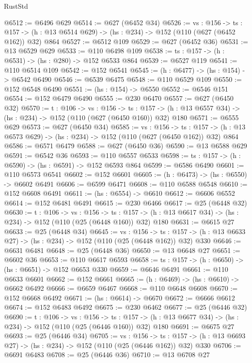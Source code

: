 \begin{lexlean}{RustStd}
\begin{coremodule}
@6512 := @6496 @629
@6514 := @627 (@6452 @34)
@6526 := {vs : @156} ->
  {ts : @157} -> (h : @13 @6514 @629) -> (hs : @234) -> @152 (@110 (@627 (@6452 @162)) @32) @864
@6527 := @6512 @109
@6529 := @627 (@6452 @36)
@6531 := @13 @6529 @629
@6533 := @110 @6498 @109
@6538 := {ts : @157} -> (h : @6531) -> (hs : @280) -> @152 @6533 @864
@6539 := @6527 @119
@6541 := @110 @6514 @109
@6542 := @152 @6541
@6545 := (h : @6477) -> (hs : @154) -> @6542 @6490
@6546 := @6539 @6475
@6548 := @110 @6529 @109
@6550 := @152 @6548 @6490
@6551 := (hs : @154) -> @6550
@6552 := @6546 @151
@6554 := @152 @6479 @6490
@6555 := @230 @6470
@6557 := @627 (@6450 @32)
@6570 := {t : @106} ->
  {vs : @156} ->
  {ts : @157} -> (h : @13 @6557 @34) -> (hs : @234) -> @152 (@110 (@627 (@6450 @160)) @32) @180
@6571 := @6555 @629
@6573 := @627 (@6450 @34)
@6585 := {vs : @156} ->
  {ts : @157} -> (h : @13 @6573 @629) -> (hs : @234) -> @152 (@110 (@627 (@6450 @162)) @32) @864
@6586 := @6571 @6479
@6588 := @627 (@6450 @36)
@6590 := @13 @6588 @629
@6591 := @6542 @36
@6593 := @110 @6557 @6533
@6598 := {ts : @157} -> (h : @6590) -> (hs : @6591) -> @152 @6593 @864
@6599 := @6586 @6490
@6601 := @110 @6573 @6541
@6602 := @152 @6601
@6605 := (h : @6473) -> (hs : @6550) -> @6602 @6491
@6606 := @6599 @6471
@6608 := @110 @6588 @6548
@6610 := @152 @6608 @6491
@6611 := (hs : @6554) -> @6610
@6612 := @6606 @6552
@6614 := @152 @6481 @6491
@6615 := @230 @6466
@6617 := @25 (@6448 @32)
@6630 := {t : @106} ->
  {vs : @156} ->
  {ts : @157} -> (h : @13 @6617 @34) -> (hs : @234) -> @152 (@110 (@25 (@6448 @160)) @32) @180
@6631 := @6615 @27
@6633 := @25 (@6448 @34)
@6645 := {vs : @156} ->
  {ts : @157} -> (h : @13 @6633 @27) -> (hs : @234) -> @152 (@110 (@25 (@6448 @162)) @32) @330
@6646 := @6631 @6481
@6648 := @25 (@6448 @36)
@6650 := @13 @6648 @27
@6651 := @6602 @36
@6653 := @110 @6617 @6593
@6658 := {ts : @157} -> (h : @6650) -> (hs : @6651) -> @152 @6653 @330
@6659 := @6646 @6491
@6661 := @110 @6633 @6601
@6662 := @152 @6661
@6665 := (h : @6469) -> (hs : @6610) -> @6662 @6492
@6666 := @6659 @6467
@6668 := @110 @6648 @6608
@6670 := @152 @6668 @6492
@6671 := (hs : @6614) -> @6670
@6672 := @6666 @6612
@6674 := @152 @6483 @6492
@6675 := @230 @6462
@6677 := @25 (@6446 @32)
@6690 := {t : @106} ->
  {vs : @156} ->
  {ts : @157} -> (h : @13 @6677 @34) -> (hs : @234) -> @152 (@110 (@25 (@6446 @160)) @32) @180
@6691 := @6675 @27
@6693 := @25 (@6446 @34)
@6705 := {vs : @156} ->
  {ts : @157} -> (h : @13 @6693 @27) -> (hs : @234) -> @152 (@110 (@25 (@6446 @162)) @32) @330
@6706 := @6691 @6483
@6708 := @25 (@6446 @36)
@6710 := @13 @6708 @27

\end{coremodule}
\end{lexlean}

